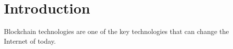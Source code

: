 \section{Introduction}
Blockchain technologies are one of the key technologies that can change the Internet of today.